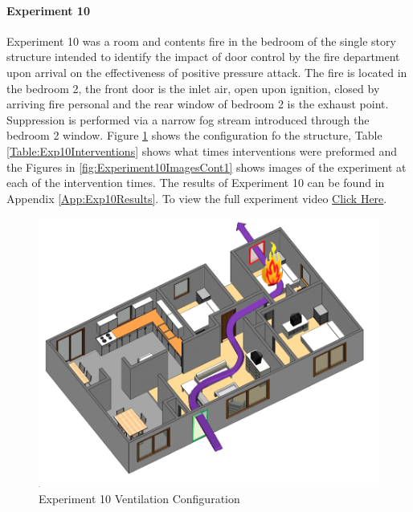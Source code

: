 \documentclass{article}
\begin{document}
\paragraph{Experiment 10}\mbox{}

Experiment 10 was a room and contents fire in the bedroom of the single story structure intended to identify the impact of door control by the fire department upon arrival on the effectiveness of positive pressure attack. The fire is located in the bedroom 2, the front door is the inlet air, open upon ignition, closed by arriving fire personal and the rear window of bedroom 2 is the exhaust point. Suppression is performed via a narrow fog stream introduced through the bedroom 2 window. Figure \ref{fig:Exp10VentConfig} shows the configuration fo the structure, Table \ref{Table:Exp10Interventions} shows what times interventions were preformed and the Figures in \ref{fig:Experiment10ImagesCont1} shows images of the experiment at each of the intervention times. The results of Experiment 10 can be found in Appendix \ref{App:Exp10Results}. To view the full experiment video \href{https://youtu.be/e76r4kRpdQg}{Click Here}.

\begin{figure}[H]
	\centering
	\includegraphics[width=5in]{0_Images/FireExperiments/Single_Story/Experiment_10.jpg}
	\caption{Experiment 10 Ventilation Configuration}
	\label{fig:Exp10VentConfig}
\end{figure}
\end{document}
